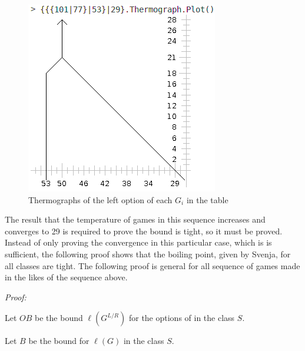 \begin{figure}[H]
\begin{center}
	\includegraphics[scale=0.5]{sections/strong_placement_games/g3L.png}
	\end{center}
	\caption{Thermographs of the left option of each $G_i$ in the table}
\end{figure}


The result that the temperature of games in this sequence increases and converges to 29 is required to prove the bound is tight, so it must be proved. Instead of only proving the convergence in this particular case, which is is sufficient, the following proof shows that the boiling point, given by Svenja, for all classes are tight. The following proof is general for all sequence of games made in the likes of the sequence above.

\textit{Proof:}

Let $OB$ be the bound $\ell(G^{L/R})$ for the options of \Gm{} in the class $S$.

Let $B$ be the bound for $\ell(G)$ in the class $S$.


